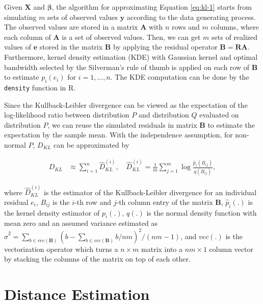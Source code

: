 \documentclass[]{interact}
\theoremstyle{plain}%
\theoremstyle{definition}
\theoremstyle{remark}
\begin{document}
Given \(\boldsymbol{X}\) and \(\boldsymbol{\beta}\), the algorithm for
approximating Equation \ref{eq:kl-1} starts from simulating \(m\) sets
of observed values \(\boldsymbol{y}\) according to the data generating
process. The observed values are stored in a matrix \(\boldsymbol{A}\)
with \(n\) rows and \(m\) columns, where each column of
\(\boldsymbol{A}\) is a set of observed values. Then, we can get \(m\)
sets of realized values of \(\boldsymbol{e}\) stored in the matrix
\(\boldsymbol{B}\) by applying the residual operator
\(\boldsymbol{B} = \boldsymbol{R}\boldsymbol{A}\). Furthermore, kernel
density estimation (KDE) with Gaussian kernel and optimal bandwidth
selected by the Silverman's rule of thumb \citep{silverman2018density}
is applied on each row of \(\boldsymbol{B}\) to estimate \(p_i(e_i)\)
for \(i = 1, ..., n\). The KDE computation can be done by the
\texttt{density} function in R.

Since the Kullback-Leibler divergence can be viewed as the expectation
of the log-likelihood ratio between distribution \(P\) and distribution
\(Q\) evaluated on distribution \(P\), we can reuse the simulated
residuals in matrix \(\boldsymbol{B}\) to estimate the expectation by
the sample mean. With the independence assumption, for non-normal \(P\),
\(D_{KL}\) can be approximated by

\begin{align*} \label{eq:kl-3}
D_{KL} &\approx \sum_{i = 1}^{n} \hat{D}_{KL}^{(i)}, \quad
\hat{D}_{KL}^{(i)} = \frac{1}{m}\sum_{j = 1}^{m} \log\frac{\hat{p}_i(B_{ij})}{q(B_{ij})},
\end{align*}

\noindent where \(\hat{D}_{KL}^{(i)}\) is the estimator of the
Kullback-Leibler divergence for an individual residual \(e_i\),
\(B_{ij}\) is the \(i\)-th row and \(j\)-th column entry of the matrix
\(\boldsymbol{B}\), \(\hat{p}_i(.)\) is the kernel density estimator of
\(p_i(.)\), \(q(.)\) is the normal density function with mean zero and
an assumed variance estimated as
\(\hat{\sigma}^2 = \sum_{b \in vec(\boldsymbol{B})}(b - \sum_{b \in vec(\boldsymbol{B})} b/nm)^2/(nm - 1)\),
and \(vec(.)\) is the vectorization operator which turns a
\(n \times m\) matrix into a \(nm \times 1\) column vector by stacking
the columns of the matrix on top of each other.

\section{Distance Estimation}\label{sec-model-distance-estimation}
\end{document}
